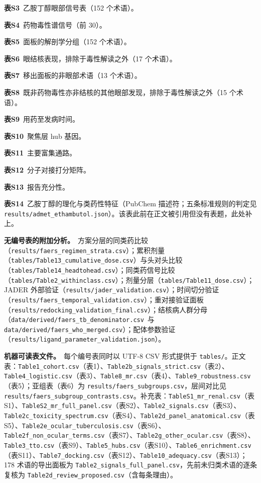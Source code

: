 \documentclass[UTF8,fontset=windows,11pt]{ctexart}
\begin{document}
\noindent \textbf{表S3}\ 乙胺丁醇眼部信号表（152 个术语）。

\noindent \textbf{表S4}\ 药物毒性谱信号（前 30）。

\noindent \textbf{表S5}\ 面板的解剖学分组（152 个术语）。

\noindent \textbf{表S6}\ 眼结核表现，排除于毒性解读之外（17 个术语）。

\noindent \textbf{表S7}\ 移出面板的非眼部术语（13 个术语）。

\noindent \textbf{表S8}\ 既非药物毒性亦非结核的其他眼部发现，排除于毒性解读之外（15 个术语）。

\noindent \textbf{表S9}\ 用药至发病时间。

\noindent \textbf{表S10}\ 聚焦层 hub 基因。

\noindent \textbf{表S11}\ 主要富集通路。

\noindent \textbf{表S12}\ 分子对接打分矩阵。

\noindent \textbf{表S13}\ 报告充分性。

\noindent \textbf{表S14}\ 乙胺丁醇的理化与类药性特征（PubChem 描述符；五条标准规则的判定见 \texttt{results/admet\_ethambutol.json}）。该表此前在正文被引用但没有表题，此处补上。

\textbf{无编号表的附加分析。}\ 方案分层的同类药比较（\texttt{results/faers\_regimen\_strata.csv}）；累积剂量（\texttt{tables/Table13\_cumulative\_dose.csv}）与头对头比较（\texttt{tables/Table14\_headtohead.csv}）；同类药信号比较（\texttt{tables/Table2\_withinclass.csv}）；剂量分层（\texttt{tables/Table11\_dose.csv}）；JADER 外部验证（\texttt{results/jader\_validation.csv}）；时间切分验证（\texttt{results/faers\_temporal\_validation.csv}）；重对接验证面板（\texttt{results/redocking\_validation\_final.csv}）；结核病人群分母（\texttt{data/derived/faers\_tb\_denominator.csv}\ 与 \texttt{data/derived/faers\_who\_merged.csv}）；配体参数验证（\texttt{results/ligand\_parameter\_validation.json}）。

\textbf{机器可读表文件。}\ 每个编号表同时以 UTF-8 CSV 形式提供于 \texttt{tables/}。正文表：\texttt{Table1\_cohort.csv}（表1）、\texttt{Table2b\_signals\_strict.csv}（表2）、\texttt{Table4\_logistic.csv}（表3）、\texttt{Table8\_mr.csv}（表4）、\texttt{Table9\_robustness.csv}（表5）；亚组表（表6）为 \texttt{results/faers\_subgroups.csv}，层间对比见 \texttt{results/faers\_subgroup\_contrasts.csv}。补充表：\texttt{TableS1\_mr\_renal.csv}（表S1）、\texttt{TableS2\_mr\_full\_panel.csv}（表S2）、\texttt{Table2\_signals.csv}（表S3）、\texttt{Table2c\_toxicity\_spectrum.csv}（表S4）、\texttt{Table2d\_panel\_anatomical.csv}（表S5）、\texttt{Table2e\_ocular\_tuberculosis.csv}（表S6）、\texttt{Table2f\_non\_ocular\_terms.csv}（表S7）、\texttt{Table2g\_other\_ocular.csv}（表S8）、\texttt{Table3\_tto.csv}（表S9）、\texttt{Table5\_hubs.csv}（表S10）、\texttt{Table6\_enrichment.csv}（表S11）、\texttt{Table7\_docking.csv}（表S12）、\texttt{Table10\_adequacy.csv}（表S13）；178 术语的导出面板为 \texttt{Table2\_signals\_full\_panel.csv}，先前未归类术语的逐条复核为 \texttt{Table2d\_review\_proposed.csv}（含每条理由）。
\end{document}
